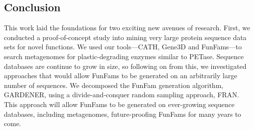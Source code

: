 \subsection{Conclusion}

This work laid the foundations for two exciting new avenues of research. First, we conducted a proof-of-concept study into mining very large protein sequence data sets for novel functions. We used our tools---CATH, Gene$3$D and FunFams---to search metagenomes for plastic-degrading enzymes similar to PETase. Sequence databases are continue to grow in size, so following on from this, we investigated approaches that would allow FunFams to be generated on an arbitrarily large number of sequences. We decomposed the FunFam generation algorithm, GARDENER, using a divide-and-conquer random sampling approach, FRAN. This approach will allow FunFams to be generated on ever-growing sequence databases, including metagenomes, future-proofing FunFams for many years to come.

